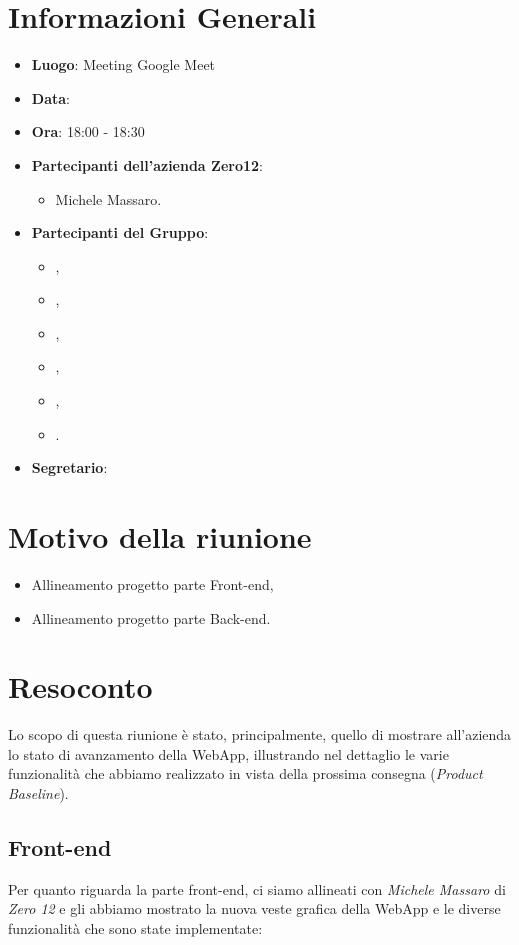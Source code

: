 \section{Informazioni Generali}

\begin{itemize}
\item{\textbf{Luogo}}: Meeting Google Meet
\item{\textbf{Data}}: \D
\item{\textbf{Ora}}: 18:00 - 18:30
\item{\textbf{Partecipanti dell'azienda Zero12}}: 
	\begin{itemize}
	\item{Michele Massaro.} 
	\end{itemize} 
\item{\textbf{Partecipanti del Gruppo}}: 
	\begin{itemize}
	\item{\EP{},} 
	\item{\FP{},}
	\item{\GC{},}
	\item{\LW{},}	
	\item{\MB{},}
	\item{\PV{}.}
	\end{itemize} 
\item{\textbf{Segretario}}: \GC{}
\end{itemize}

\section{Motivo della riunione}
\begin{itemize}
	\item {Allineamento progetto parte Front-end,}
	\item {Allineamento progetto parte Back-end.}
\end{itemize}

\section{Resoconto}

Lo scopo di questa riunione è stato, principalmente, quello di mostrare all'azienda lo stato di avanzamento della WebApp, illustrando nel dettaglio le varie funzionalità che abbiamo realizzato in vista della prossima consegna (\textit{Product Baseline}). 

\subsection{Front-end}
Per quanto riguarda la parte front-end, ci siamo allineati con \textit{Michele Massaro} di \textit{Zero 12} e gli abbiamo mostrato la nuova veste grafica della WebApp e le diverse funzionalità che sono state implementate:

